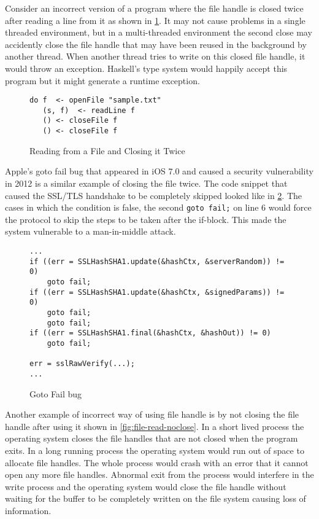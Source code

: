 Consider an incorrect version of a program where the file handle is closed twice after reading a line from it as shown in \cref{fig:file-read-close-2times}.
It may not cause problems in a single threaded environment, but in a multi-threaded environment
the second close may accidently close the file handle that may have been reused in the background by another thread.
When another thread tries to write on this closed file handle, it would throw an exception.
Haskell's type system would happily accept this program but it might generate a runtime exception.
\begin{figure}[h]
  \begin{framed}
    \begin{verbatim}
do f  <- openFile "sample.txt"
   (s, f)  <- readLine f
   () <- closeFile f
   () <- closeFile f
    \end{verbatim}
  \end{framed}
  \caption{Reading from a File and Closing it Twice}
  \label{fig:file-read-close-2times}
\end{figure}

Apple's goto fail bug that appeared in iOS 7.0 and caused a security vulnerability in 2012 is a similar example of closing the file twice.
The code snippet that caused the SSL/TLS handshake to be completely skipped looked like in \cref{fig:goto-fail}.
The cases in which the condition is false, the second \texttt{goto fail;} on line 6 would force the protocol to skip the
steps to be taken after the if-block. This made the system vulnerable to a man-in-middle attack.
\begin{figure}[h]
  \begin{framed}
\begin{verbatim}
...
if ((err = SSLHashSHA1.update(&hashCtx, &serverRandom)) != 0)
    goto fail;
if ((err = SSLHashSHA1.update(&hashCtx, &signedParams)) != 0)
    goto fail;
    goto fail;
if ((err = SSLHashSHA1.final(&hashCtx, &hashOut)) != 0)
    goto fail;

err = sslRawVerify(...);
...
\end{verbatim}
  \end{framed}
  \caption{Goto Fail bug}
  \label{fig:goto-fail}
\end{figure}

Another example of incorrect way of using file handle is by not closing the file handle after using it shown in \cref{fig:file-read-noclose}.
In a short lived process the operating system closes the file handles that are not closed when the program exits.
In a long running process the operating system would run out of space to allocate file handles. The whole process would crash with an error that
it cannot open any more file handles. Abnormal exit from the process would interfere in the write process
and the operating system would close the file handle without waiting for the buffer to be completely
written on the file system causing loss of information.

